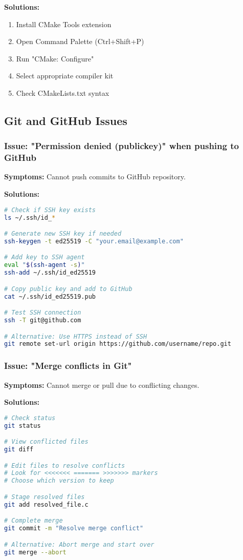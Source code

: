 \documentclass[11pt,a4paper]{article}
\begin{document}
\textbf{Solutions:}
\begin{enumerate}
    \item Install CMake Tools extension
    \item Open Command Palette (Ctrl+Shift+P)
    \item Run "CMake: Configure"
    \item Select appropriate compiler kit
    \item Check CMakeLists.txt syntax
\end{enumerate}

\subsection{Git and GitHub Issues}

\subsubsection{Issue: "Permission denied (publickey)" when pushing to GitHub}
\textbf{Symptoms:} Cannot push commits to GitHub repository.

\textbf{Solutions:}
\begin{lstlisting}[language=bash]
# Check if SSH key exists
ls ~/.ssh/id_*

# Generate new SSH key if needed
ssh-keygen -t ed25519 -C "your.email@example.com"

# Add key to SSH agent
eval "$(ssh-agent -s)"
ssh-add ~/.ssh/id_ed25519

# Copy public key and add to GitHub
cat ~/.ssh/id_ed25519.pub

# Test SSH connection
ssh -T git@github.com

# Alternative: Use HTTPS instead of SSH
git remote set-url origin https://github.com/username/repo.git
\end{lstlisting}

\subsubsection{Issue: "Merge conflicts in Git"}
\textbf{Symptoms:} Cannot merge or pull due to conflicting changes.

\textbf{Solutions:}
\begin{lstlisting}[language=bash]
# Check status
git status

# View conflicted files
git diff

# Edit files to resolve conflicts
# Look for <<<<<<< ======= >>>>>>> markers
# Choose which version to keep

# Stage resolved files
git add resolved_file.c

# Complete merge
git commit -m "Resolve merge conflict"

# Alternative: Abort merge and start over
git merge --abort
\end{lstlisting}
\end{document}
